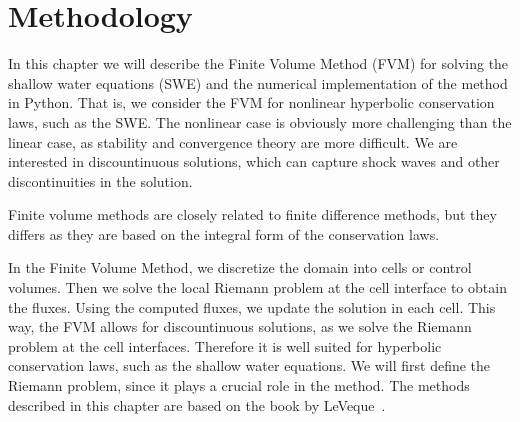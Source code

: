 \chapter{Methodology}
In this chapter we will describe the Finite Volume Method (FVM) for solving the shallow water equations (SWE) and the numerical implementation of the method in Python.
That is, we consider the FVM for nonlinear hyperbolic conservation laws, such as the SWE.
The nonlinear case is obviously more challenging than the linear case, as stability and convergence theory are more difficult.
We are interested in discountinuous solutions, which can capture shock waves and other discontinuities in the solution.

Finite volume methods are closely related to finite difference methods, but they differs as they are based on the integral form of the conservation laws.

In the Finite Volume Method, we discretize the domain into cells or control volumes.
Then we solve the local Riemann problem at the cell interface to obtain the fluxes.
Using the computed fluxes, we update the solution in each cell.
This way, the FVM allows for discountinuous solutions, as we solve the Riemann problem at the cell interfaces.
Therefore it is well suited for hyperbolic conservation laws, such as the shallow water equations.
We will first define the Riemann problem, since it plays a crucial role in the method.
The methods described in this chapter are based on the book by LeVeque~\cite{LeVeque2002}.










